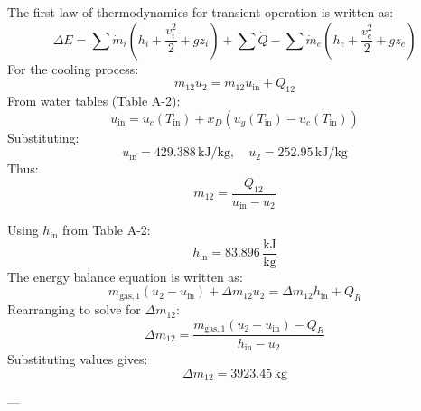 The first law of thermodynamics for transient operation is written as:  
\[
\Delta E = \sum \dot{m}_i \left( h_i + \frac{v_i^2}{2} + g z_i \right) + \sum \dot{Q} - \sum \dot{m}_e \left( h_e + \frac{v_e^2}{2} + g z_e \right)
\]  
For the cooling process:  
\[
m_{12} u_2 = m_{12} u_{\text{in}} + Q_{12}
\]  
From water tables (Table A-2):  
\[
u_{\text{in}} = u_c \left( T_{\text{in}} \right) + x_D \left( u_g \left( T_{\text{in}} \right) - u_c \left( T_{\text{in}} \right) \right)
\]  
Substituting:  
\[
u_{\text{in}} = 429.388 \, \text{kJ/kg}, \quad u_2 = 252.95 \, \text{kJ/kg}
\]  
Thus:  
\[
m_{12} = \frac{Q_{12}}{u_{\text{in}} - u_2}
\]

Using \( h_{\text{in}} \) from Table A-2:  
\[
h_{\text{in}} = 83.896 \, \frac{\text{kJ}}{\text{kg}}
\]  
The energy balance equation is written as:  
\[
m_{\text{gas},1} (u_2 - u_{\text{in}}) + \Delta m_{12} u_2 = \Delta m_{12} h_{\text{in}} + Q_{R}
\]  
Rearranging to solve for \( \Delta m_{12} \):  
\[
\Delta m_{12} = \frac{m_{\text{gas},1} (u_2 - u_{\text{in}}) - Q_{R}}{h_{\text{in}} - u_2}
\]  
Substituting values gives:  
\[
\Delta m_{12} = 3923.45 \, \text{kg}
\]  

---
